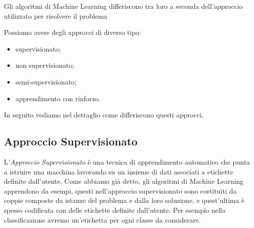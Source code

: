 \documentclass[a4paper,12pt]{report}
\begin{document}

%
\bigskip
Gli algoritmi di Machine Learning differiscono tra loro a seconda  dell'approccio utilizzato per risolvere il problema 



Possiamo avere degli approcci di diverso tipo:
\begin{itemize}
    \item supervisionato;
    \item non supervisionato;
    \item semi-supervisionato;
    \item apprendimento con rinforzo.
\end{itemize}

\noindent In seguito vediamo nel dettaglio come differiscono questi approcci.

\subsection*{Approccio Supervisionato}
L'\textit{Approccio Supervisionato} \cite{machine_learning_oreilly}\cite{unsupervised_learning} è una tecnica di apprendimento automatico che punta a istruire una macchina lavorando su un insieme di dati associati a etichette definite dall'utente.
Come abbiamo già detto, gli algoritmi di Machine Learning apprendono da esempi, questi nell'approccio supervisionato sono costituiti da coppie composte da istanze del problema e dalla loro soluzione, e quest'ultima è spesso codificata con delle etichette definite dall'utente. Per esempio nella classificazione avremo un'etichetta per ogni classe da considerare.

\end{document}
